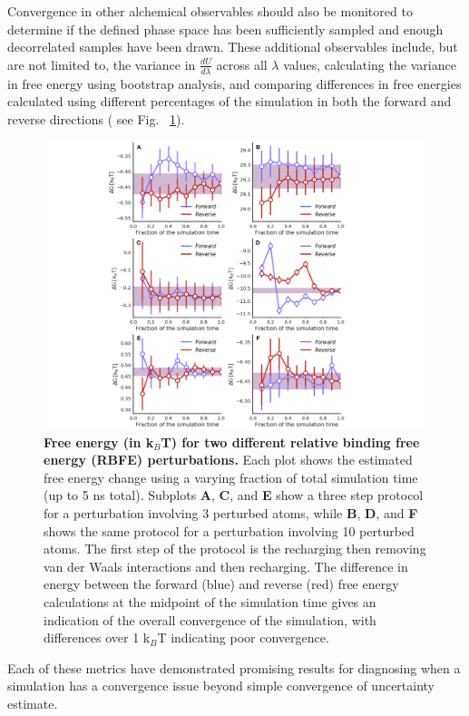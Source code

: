 \documentclass[9pt,bestpractices]{livecoms}
\begin{document}
%
Convergence in other alchemical observables should also be monitored to determine if the defined phase space has been sufficiently sampled and enough decorrelated samples have been drawn. These additional observables include, but are not limited to, the variance in $\frac{dU}{d\lambda}$ across all $\lambda$ values, calculating the variance in free energy using bootstrap analysis, and comparing differences in free energies calculated using different percentages of the simulation in both the forward and reverse directions ( see Fig. ~\ref{fig:convergence_forward_reverse}).
%
\begin{figure}
    \centering
    \includegraphics[width=0.95\linewidth]{figures/fig10_forward_reverse/Figure.pdf}
    \caption{\textbf{Free energy (in k$_{B}$T) for two different relative binding free energy (RBFE) perturbations.} 
    Each plot shows the estimated free energy change using a varying fraction of total simulation time (up to 5 ns total). 
    Subplots \textbf{A}, \textbf{C}, and \textbf{E} show a three step protocol  for a perturbation involving 3 perturbed atoms, while \textbf{B}, \textbf{D}, and \textbf{F} shows the same protocol for a perturbation involving 10 perturbed atoms. The first step of the protocol is the recharging then removing van der Waals interactions and then recharging. The difference in energy between the forward (blue) and reverse (red) free energy calculations at the midpoint of the simulation time gives an indication of the overall convergence of the simulation, with differences over 1 k$_{B}$T indicating poor convergence.}
    \label{fig:convergence_forward_reverse}
\end{figure}
%
Each of these metrics have demonstrated promising results for diagnosing when a simulation has a convergence issue beyond simple convergence of uncertainty estimate. 
\end{document}
